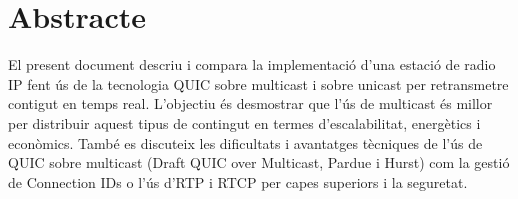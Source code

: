 \section*{Abstracte}

{
    El present document descriu i compara la implementació d'una estació de radio \ac{IP} fent ús de la tecnologia QUIC sobre multicast
    i sobre unicast per retransmetre contigut en temps real. L'objectiu és desmostrar que l'ús de multicast és millor per distribuir 
    aquest tipus de contingut en termes d'escalabilitat, energètics i econòmics. També es discuteix les dificultats i avantatges tècniques
    de l'ús de QUIC sobre multicast (Draft QUIC over Multicast, Pardue i Hurst) com la gestió de Connection IDs o l'ús d'\ac{RTP}
    i \ac{RTCP} per capes superiors i la seguretat.

}
